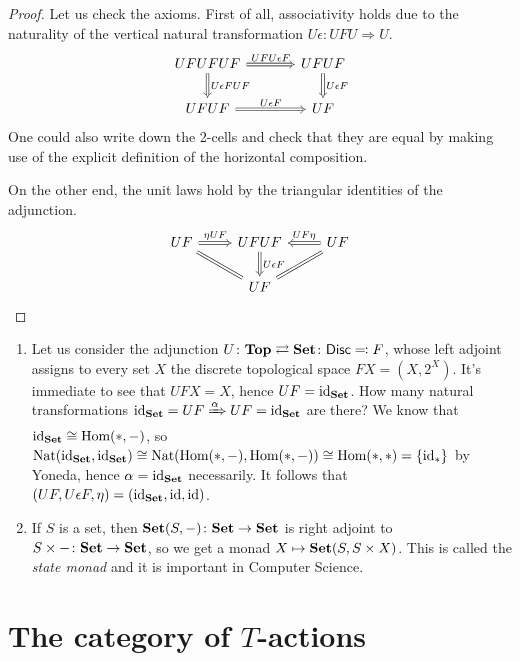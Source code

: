 \documentclass[a4paper,11pt,oneside,openany]{scrbook}
\begin{document}
\begin{proof}
	Let us check the axioms. First of all, associativity holds due to the naturality of the vertical natural transformation $U\epsilon\colon UFU\Rightarrow U$.
	\[
		\begin{tikzcd}[column sep=3.5em]
			UFUFUF\ar[r, Rightarrow, "UFU\epsilon F"]\ar[d, Rightarrow, "U\epsilon FUF"]
			& UFUF\ar[d, Rightarrow, "U\epsilon F"] \\
			UFUF\ar[r, Rightarrow, "U\epsilon F"]
			& UF
		\end{tikzcd}
	\]
	One could also write down the 2-cells and check that they are equal by making use of the explicit definition of the horizontal composition.

	On the other end, the unit laws hold by the triangular identities of the adjunction.
	\[
		\begin{tikzcd}
			UF\ar[r, Rightarrow, "\eta UF"]\ar[dr, equal]
			& UFUF\ar[d, Rightarrow, "U\epsilon F"]
			& UF\ar[l, Rightarrow, swap, "UF\eta"]\ar[dl, Rightarrow, equal] \\
			& UF
		\end{tikzcd}
	\]
\end{proof}

\begin{exmp}
	\begin{enumerate}
		\item Let us consider the adjunction $U\colon\mathbf{Top}\rightleftarrows{\normalfont\textbf{Set}}\colon\mathsf{Disc}\eqqcolon F$, whose left adjoint assigns to every set $X$ the discrete topological space $FX=(X, 2^X)$.
		      It's immediate to see that $UFX=X$, hence $UF=\operatorname{id}_{\normalfont\textbf{Set}}$. How many natural transformations $\operatorname{id}_{\normalfont\textbf{Set}}=UF\xRightarrow{\alpha} UF=\operatorname{id}_{\normalfont\textbf{Set}}$ are there?
		      We know that $\operatorname{id}_{\normalfont\textbf{Set}}\cong\operatorname{\text{Hom}}(*,-)$, so $\text{Nat}(\operatorname{id}_{\normalfont\textbf{Set}},
			      \operatorname{id}_{\normalfont\textbf{Set}})\cong\text{Nat}(\operatorname{\text{Hom}}(*,-),\operatorname{\text{Hom}}(*,-))\cong\operatorname{\text{Hom}}(*,*)=\{\operatorname{id}_*\}$
                  by Yoneda, hence $\alpha=\operatorname{id}_{\normalfont\textbf{Set}}$ necessarily. It follows
                  that $(UF,U\epsilon F,\eta)=(\operatorname{id}_{\normalfont\textbf{Set}}, \operatorname{id}, \operatorname{id})$.
		\item If $S$ is a set, then ${\normalfont\textbf{Set}}(S,-)\colon{\normalfont\textbf{Set}}\to{\normalfont\textbf{Set}}$ is right
            adjoint to $S\times-\colon{\normalfont\textbf{Set}}\to{\normalfont\textbf{Set}}$, so we get a monad
            $X\mapsto{\normalfont\textbf{Set}}(S,S\times X)$. This is called the \emph{state monad}
            and it is important in Computer Science.
	\end{enumerate}
\end{exmp}


\section{The category of $T$-actions}
\end{document}
